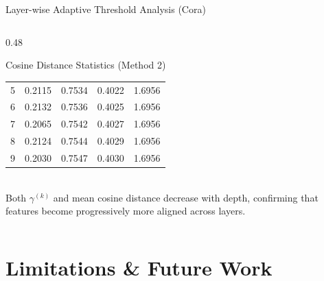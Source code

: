 \documentclass[aspectratio=169]{beamer}
\begin{document}
\begin{frame}{Layer-wise Adaptive Threshold Analysis (Cora)}
\begin{columns}[T]
\begin{column}{0.48\textwidth}
\begin{block}{Cosine Distance Statistics (Method 2)}
\begin{tabular}{ccccc}
          5 & 0.2115 & 0.7534 & 0.4022 & 1.6956 \\
          6 & 0.2132 & 0.7536 & 0.4025 & 1.6956 \\
          7 & 0.2065 & 0.7542 & 0.4027 & 1.6956 \\
          8 & 0.2124 & 0.7544 & 0.4029 & 1.6956 \\
          9 & 0.2030 & 0.7547 & 0.4030 & 1.6956 \\
          \bottomrule
        \end{tabular}
        \vspace{4pt}\\
        \small Both $\gamma^{(k)}$ and mean cosine distance decrease with depth, confirming that features become progressively more aligned across layers.
      \end{block}
    \end{column}
  \end{columns}
\end{frame}

\section{Limitations \& Future Work}
\end{document}
